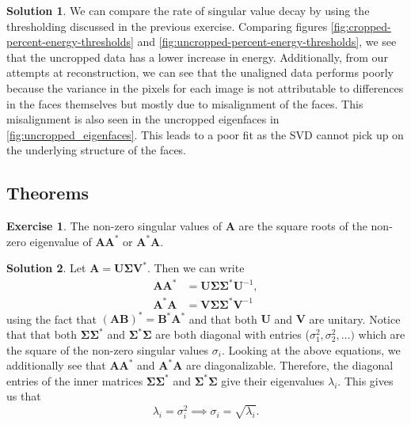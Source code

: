 \documentclass[12pt]{article}
\renewcommand{\vec}[1]{\mathbf{#1}}
\theoremstyle{definition}
\newtheorem{exer}{Exercise}
\newtheorem{sol}{Solution}
\theoremstyle{remark}
\begin{document}
\begin{sol}
    We can compare the rate of singular value decay by using the thresholding discussed in the previous exercise. Comparing figures \cref{fig:cropped-percent-energy-thresholds} and \cref{fig:uncropped-percent-energy-thresholds}, we see that the uncropped data has a lower increase in energy. Additionally, from our attempts at reconstruction, we can see that the unaligned data performs poorly because the variance in the pixels for each image is not attributable to differences in the faces themselves but mostly due to misalignment of the faces. This misalignment is also seen in the uncropped eigenfaces in \cref{fig:uncropped_eigenfaces}. This leads to a poor fit as the SVD cannot pick up on the underlying structure of the faces. 
\end{sol}
\newpage

\subsection*{Theorems}%
\label{sub:theorems}

\begin{exer}
    The non-zero singular values of $\vec{A}$ are the square roots of the non-zero eigenvalue of $\vec{A}\vec{A}^*$ or $\vec{A}^*\vec{A}$.
\end{exer}
\begin{sol}
    Let $\vec{A} = \vec{U\Sigma V}^*$. Then we can write 
    \begin{align}
        \vec{A A}^* &= \vec{U}\vec{\Sigma}\vec{\Sigma}^*\vec{U}^{-1},\\
        \vec{A}^*\vec{A}  &= \vec{V}\vec{\Sigma}\vec{\Sigma}^*\vec{V}^{-1}
    \end{align}
    using the fact that $(\vec{AB})^* = \vec{B}^*\vec{A}^*$ and that both $\vec{U}$ and $\vec{V}$ are unitary. Notice that that both $\vec{\Sigma}\vec{\Sigma}^*$ and $\vec{\Sigma}^*\vec{\Sigma}$ are both diagonal with entries ($\sigma_1^2,\sigma_2^2, \ldots)$ which are the square of the non-zero singular values $\sigma_i$. Looking at the above equations, we additionally see that $\vec{A}\vec{A}^*$ and $\vec{A}^*\vec{A}$ are diagonalizable. Therefore, the diagonal entries of the inner matrices $\vec{\Sigma}\vec{\Sigma}^*$ and $\vec{\Sigma}^*\vec{\Sigma}$ give their eigenvalues $\lambda_i$. This gives us that
    \begin{equation}
        \lambda_i = \sigma_i^2 \implies \sigma_i = \sqrt{\lambda_i}.
    \end{equation}
\end{sol}
\end{document}
